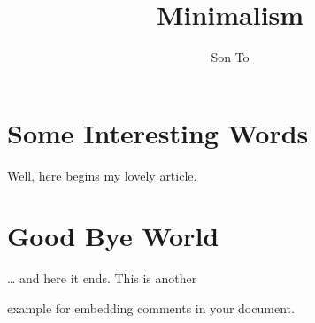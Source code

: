 \documentclass[a4paper,11pt]{article}
\author{Son To}
\title{Minimalism}
\begin{document}
\maketitle
\tableofcontents
\section{Some Interesting Words}
Well, here begins my lovely article.
\section{Good Bye World}
\ldots{} and here it ends.
This is another
\begin{comment}
rather stupid,
but helpful
\end{comment}
example for embedding comments in your document.
\end{document}
